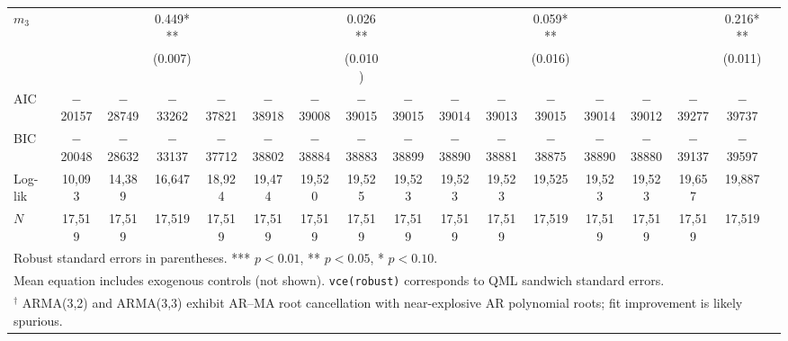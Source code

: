 \begin{table}[!htbp]
{\begin{tabular}{lcccccccccccccccc}
$m_{3}$ &  &  & 0.449*** &  &  &  & 0.026** &  &  &  & 0.059***  &  &  &  & 0.216*** \\
        &  &  & (0.007)  &  &  &  & (0.010) &  &  &  & (0.016)   &  &  &  & (0.011)  \\
\midrule
AIC     & $-$20157 & $-$28749 & $-$33262 & $-$37821 & $-$38918 & $-$39008 & $-$39015 & $-$39015 & $-$39014 & $-$39013 & $-$39015 & $-$39014 & $-$39012 & $-$39277 & $-$39737 \\
BIC     & $-$20048 & $-$28632 & $-$33137 & $-$37712 & $-$38802 & $-$38884 & $-$38883 & $-$38899 & $-$38890 & $-$38881 & $-$38875 & $-$38890 & $-$38880 & $-$39137 & $-$39597 \\
Log-lik & 10{,}093 & 14{,}389 & 16{,}647 & 18{,}924 & 19{,}474 & 19{,}520 & 19{,}525 & 19{,}523 & 19{,}523 & 19{,}523 & 19{,}525 & 19{,}523 & 19{,}523 & 19{,}657 & 19{,}887 \\
$N$     & 17{,}519 & 17{,}519 & 17{,}519 & 17{,}519 & 17{,}519 & 17{,}519 & 17{,}519 & 17{,}519 & 17{,}519 & 17{,}519 & 17{,}519 & 17{,}519 & 17{,}519 & 17{,}519 & 17{,}519 \\
\bottomrule
\multicolumn{16}{l}{\footnotesize Robust standard errors in parentheses. *** $p<0.01$, ** $p<0.05$, * $p<0.10$.} \\
\multicolumn{16}{l}{\footnotesize Mean equation includes exogenous controls (not shown). \texttt{vce(robust)} corresponds to QML sandwich standard errors.} \\
\multicolumn{16}{l}{\footnotesize $^\dagger$ ARMA(3,2) and ARMA(3,3) exhibit AR--MA root cancellation with near-explosive AR polynomial roots; fit improvement is likely spurious.} \\
\end{tabular}%
}
\end{table}
